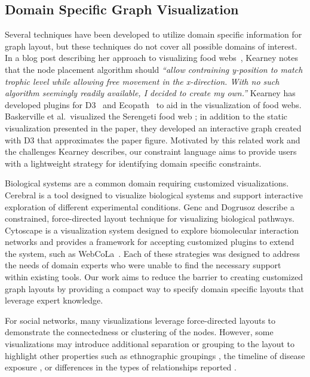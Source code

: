 \subsection{Domain Specific Graph Visualization}
Several techniques have been developed to utilize
domain specific information for graph layout, but these techniques do not cover
all possible domains of interest. In a blog post describing her approach to
visualizing food webs~\cite{kearney2016blog}, Kearney notes that the node
placement algorithm should \emph{``allow contraining y-position to match
  trophic level while allowing free movement in the x-direction. With no
  such algorithm seemingly readily available, I decided to create my
  own.''} Kearney has developed plugins for D3~\cite{kearney2017d3} and
Ecopath~\cite{kearney2017ecopath} to aid in the visualization of
food webs. Baskerville et al.\ visualized the Serengeti food web
\cite{baskerville2011spatial}; in addition to the static visualization
presented in the paper, they developed an interactive graph
\cite{baskerville2011interactive} created with D3 that approximates the
paper figure. Motivated by this related work and the
challenges Kearney describes, our constraint language aims to provide users
with a lightweight strategy for identifying domain specific constraints.

Biological systems are a common domain requiring customized visualizations.
Cerebral \cite{barsky2008cerebral} is a tool designed to visualize
biological systems and support interactive exploration of different
experimental conditions. Genc and Dogrusoz \cite{saraiya2005visualizing}
describe a constrained, force-directed layout technique for visualizing 
biological pathways. Cytoscape \cite{shannon2003cytoscape} is a
visualization system designed to explore biomolecular interaction networks
and provides a framework for accepting customized plugins to extend the
system, such as WebCoLa~\cite{WebCoLa}. Each of these strategies was designed to
address the needs of domain experts who were unable to find the necessary
support within existing tools. Our work aims to reduce the barrier to
creating customized graph layouts by providing a compact way to specify domain
specific layouts that leverage expert knowledge.

For social networks, many visualizations leverage force-directed layouts
to demonstrate the connectedness or clustering of the nodes. However, some
visualizations may introduce additional separation or grouping to the layout
to highlight other properties such as ethnographic groupings \cite{rothenberg1998using},
the timeline of disease exposure \cite{fitzpatrick2001preventable,mcelroy2003network},
or differences in the types of relationships reported \cite{fu2011hiv}.

